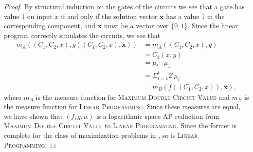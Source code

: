 \documentclass[]{article}
\begin{document}
\begin{proof}
  By structural induction on the gates of the circuits we see that a gate has value 1 on input $x$ if and only if the solution vector $\mathbf{x}$ has a value 1 in the corresponding component, and $\mathbf{x}$ must be a vector over $\{0, 1\}$.
  Since the linear program correctly simulates the circuits, we see that
  \begin{align*}
    m_A((C_1, C_2, x), g((C_1, C_2, x), \mathbf{x})) & = m_A((C_1, C_2, x), y) \\
    & = C_2(x, y) \\
    & = \mu_t \dotsb \mu_1 \\
    & = \Sigma^t_{i = 1} 2^i \mu_i \\
    & = m_B(f((C_1, C_2, x)), \mathbf{x}),
  \end{align*}
  where $m_A$ is the measure function for \textsc{Maximum Double Circuit Value} and $m_B$ is the measure function for \textsc{Linear Programming}.
  Since these measures are equal, we have shown that $(f, g, \alpha)$ is a logarithmic space AP reduction from \textsc{Maximum Double Circuit Value} to \textsc{Linear Programming}.
  Since the former is complete for the class of maximization problems in \PO, so is \textsc{Linear Programming}.
\end{proof}


\end{document}
